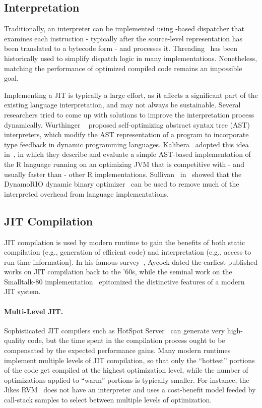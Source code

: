 \subsection*{Interpretation}
Traditionally, an interpreter can be implemented using -based dispatcher that examines each instruction - typically after the source-level representation has been translated to a bytecode form - and processes it. Threading~\cite{Bell73} has been historically used to simplify dispatch logic in many implementations. Nonetheless, matching the performance of optimized compiled code remains an impossible goal.

Implementing a JIT is typically a large effort, as it affects a significant part of the existing language interpretation, and may not always be sustainable. Several researchers tried to come up with solutions to improve the interpretation process dynamically. Wurthinger \etal~\cite{Wurthinger12} proposed self-optimizing abstract syntax tree (AST) interpreters, which modify the AST representation of a program to incorporate type feedback in dynamic programming languages. Kalibera \etal\ adopted this idea in~\cite{Kalibera14}, in which they describe and evaluate a simple AST-based implementation of the R language running on an optimizing JVM that is competitive with - and usually faster than - other R implementations. Sullivan \etal\ in~\cite{Sullivan03} showed that the DynamoRIO dynamic binary optimizer~\cite{Bala00} can be used to remove much of the interpreted overhead from language implementations.

\subsection*{JIT Compilation}

JIT compilation is used by modern runtime to gain the benefits of both static compilation (e.g., generation of efficient code) and interpretation (e.g., access to run-time information). In his famous survey~\cite{Aycock03}, Aycock dated the earliest published works on JIT compilation back to the '60s, while the seminal work on the Smalltalk-80 implementation~\cite{Deutsch84} epitomized the distinctive features of a modern JIT system.

\paragraph*{Multi-Level JIT.} Sophisticated JIT compilers such as HotSpot Server~\cite{Paleczny01} can generate very high-quality code, but the time spent in the compilation process ought to be compensated by the expected performance gains. Many modern runtimes implement multiple levels of JIT compilation, so that only the ``hottest'' portions of the code get compiled at the highest optimization level, while the number of optimizations applied to ``warm'' portions is typically smaller. For instance, the Jikes RVM~\cite{Alpern00} does not have an interpreter and uses a cost-benefit model feeded by call-stack samples to select between multiple levels of optimization.

